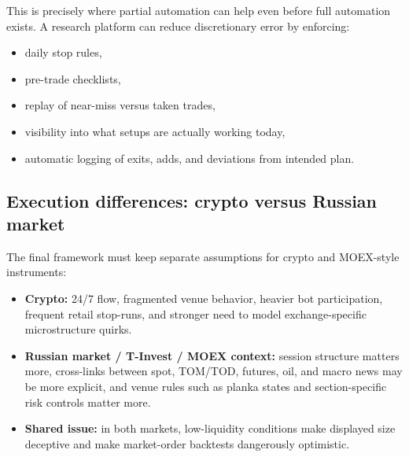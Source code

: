 This is precisely where partial automation can help even before full automation exists. A research platform can reduce discretionary error by enforcing:

\begin{itemize}[leftmargin=1.5em]
\item daily stop rules,
\item pre-trade checklists,
\item replay of near-miss versus taken trades,
\item visibility into what setups are actually working today,
\item automatic logging of exits, adds, and deviations from intended plan.
\end{itemize}

\subsection{Execution differences: crypto versus Russian market}

The final framework must keep separate assumptions for crypto and MOEX-style instruments:

\begin{itemize}[leftmargin=1.5em]
\item \textbf{Crypto:} 24/7 flow, fragmented venue behavior, heavier bot participation, frequent retail stop-runs, and stronger need to model exchange-specific microstructure quirks.
\item \textbf{Russian market / T-Invest / MOEX context:} session structure matters more, cross-links between spot, TOM/TOD, futures, oil, and macro news may be more explicit, and venue rules such as planka states and section-specific risk controls matter more.
\item \textbf{Shared issue:} in both markets, low-liquidity conditions make displayed size deceptive and make market-order backtests dangerously optimistic.
\end{itemize}
